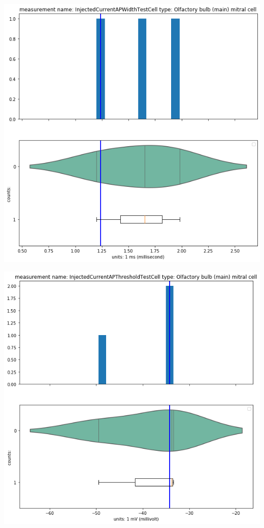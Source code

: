     \begin{center}
    \includegraphics[width=0.7\linewidth]{notebooks_converted/needata_thesis_files/needata_thesis_5_25.png}
    \end{center}

    \begin{center}
    \includegraphics[width=0.7\linewidth]{notebooks_converted/needata_thesis_files/needata_thesis_5_26.png}
    \end{center}

